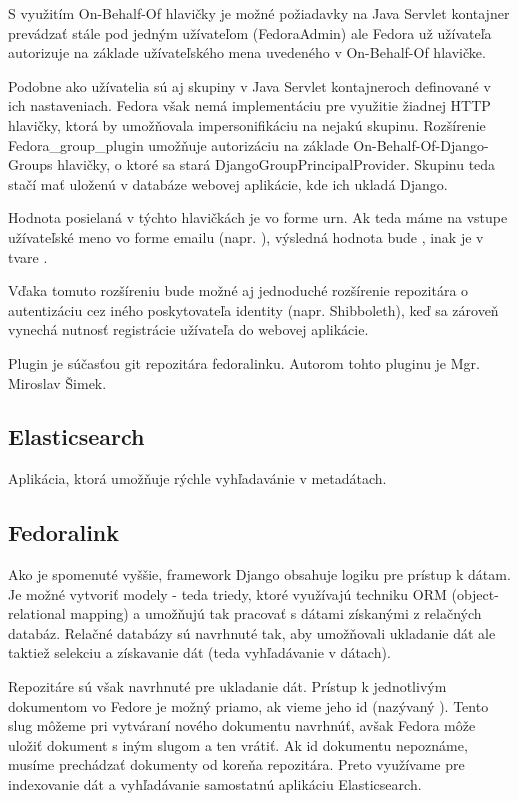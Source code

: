 \documentclass[thesis=M,slovak]{FITthesis}[2013/05/06]
\begin{document}
S využitím On-Behalf-Of hlavičky je možné požiadavky na Java Servlet kontajner prevádzať stále pod jedným užívateľom (FedoraAdmin) ale Fedora už užívateľa autorizuje na základe užívateľského mena uvedeného v On-Behalf-Of hlavičke.

Podobne ako užívatelia sú aj skupiny v Java Servlet kontajneroch definované v ich nastaveniach. Fedora však nemá implementáciu pre využitie žiadnej HTTP hlavičky, ktorá by umožňovala impersonifikáciu na nejakú skupinu. Rozšírenie Fedora\_group\_plugin umožňuje autorizáciu na základe On-Behalf-Of-Django-Groups hlavičky, o ktoré sa stará DjangoGroupPrincipalProvider. Skupinu teda stačí mať uloženú v databáze webovej aplikácie, kde ich ukladá Django.

Hodnota posielaná v týchto hlavičkách je vo forme urn.
Ak teda máme na vstupe užívateľské meno vo forme emailu (napr. ), výsledná hodnota bude , inak je v tvare . 

Vďaka tomuto rozšíreniu bude možné aj jednoduché rozšírenie repozitára o autentizáciu cez iného poskytovateľa identity (napr. Shibboleth), keď sa zároveň vynechá nutnosť registrácie užívateľa do webovej aplikácie.

Plugin je súčasťou git repozitára fedoralinku. Autorom tohto pluginu je Mgr. Miroslav Šimek. 

\subsection{Elasticsearch}
Aplikácia, ktorá umožňuje rýchle vyhľadavánie v metadátach.

\subsection{Fedoralink}
Ako je spomenuté vyššie, framework Django obsahuje logiku pre prístup k dátam. Je možné vytvoriť modely - teda triedy, ktoré využívajú techniku ORM (object-relational mapping) a umožňujú tak pracovať s dátami získanými z relačných databáz. Relačné databázy sú navrhnuté tak, aby umožňovali ukladanie dát ale taktiež selekciu a získavanie dát (teda vyhľadávanie v dátach).

Repozitáre sú však navrhnuté pre ukladanie dát. Prístup k jednotlivým dokumentom vo Fedore je možný priamo, ak vieme jeho id (nazývaný ). Tento slug môžeme pri vytváraní nového dokumentu navrhnúť, avšak Fedora môže uložiť dokument s iným slugom a ten vrátiť. Ak id dokumentu nepoznáme, musíme prechádzať dokumenty od koreňa repozitára. Preto využívame pre indexovanie dát a vyhľadávanie samostatnú aplikáciu Elasticsearch.
\end{document}
